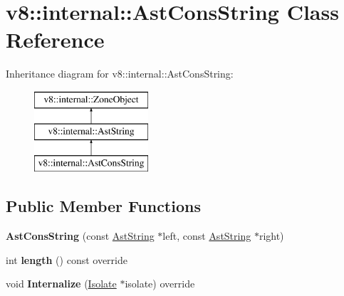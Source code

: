 \hypertarget{classv8_1_1internal_1_1_ast_cons_string}{}\section{v8\+:\+:internal\+:\+:Ast\+Cons\+String Class Reference}
\label{classv8_1_1internal_1_1_ast_cons_string}
Inheritance diagram for v8\+:\+:internal\+:\+:Ast\+Cons\+String\+:\begin{figure}[H]
\begin{center}
\leavevmode
\includegraphics[height=3.000000cm]{classv8_1_1internal_1_1_ast_cons_string}
\end{center}
\end{figure}
\subsection*{Public Member Functions}
\begin{DoxyCompactItemize}
\item 
{\bfseries Ast\+Cons\+String} (const \hyperlink{classv8_1_1internal_1_1_ast_string}{Ast\+String} $\ast$left, const \hyperlink{classv8_1_1internal_1_1_ast_string}{Ast\+String} $\ast$right)\hypertarget{classv8_1_1internal_1_1_ast_cons_string_a63b072d83d50c6bfe1e7d3ae7720856b}{}\label{classv8_1_1internal_1_1_ast_cons_string_a63b072d83d50c6bfe1e7d3ae7720856b}

\item 
int {\bfseries length} () const  override\hypertarget{classv8_1_1internal_1_1_ast_cons_string_adf547406d1791358a11293ed7c061093}{}\label{classv8_1_1internal_1_1_ast_cons_string_adf547406d1791358a11293ed7c061093}

\item 
void {\bfseries Internalize} (\hyperlink{classv8_1_1internal_1_1_isolate}{Isolate} $\ast$isolate) override\hypertarget{classv8_1_1internal_1_1_ast_cons_string_a9bfc9c05c11ea9ad40a727608446852a}{}\label{classv8_1_1internal_1_1_ast_cons_string_a9bfc9c05c11ea9ad40a727608446852a}

\end{DoxyCompactItemize}

